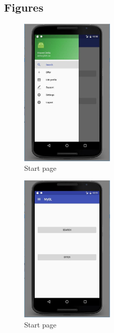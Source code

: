 \documentclass[11pt,twoside,a4paper]{report}
\begin{document}
\begin{appendices}

\chapter{Figures}
\label{appendix}

\thispagestyle{empty}

\newpage

\begin{figure}
	\centering
	\includegraphics[width=0.4\textwidth]{jpg/android-start-page-1.jpg}
	\caption{Start page}
	\label{figure:start-page}
\end{figure}

\begin{figure}
	\centering
	\includegraphics[width=0.4\textwidth]{jpg/android-start-page-2.jpg}
	\caption{Start page}
	\label{figure:start-page}
\end{figure}


\end{appendices}
\end{document}
